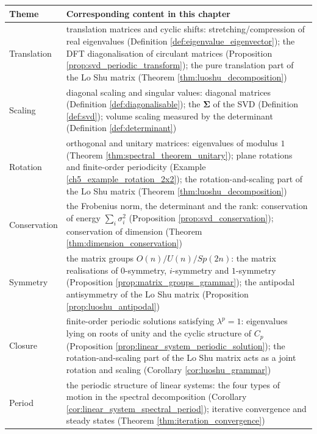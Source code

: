 \begingroup
\renewcommand{\arraystretch}{1.3}
\begin{longtable}{>{\raggedright\arraybackslash}p{3cm}>{\raggedright\arraybackslash}p{10.5cm}}
\toprule
Theme & Corresponding content in this chapter \\
\midrule
Translation & translation matrices and cyclic shifts: stretching/compression of real eigenvalues (Definition \ref{def:eigenvalue_eigenvector}); the DFT diagonalisation of circulant matrices (Proposition \ref{prop:svd_periodic_transform}); the pure translation part of the Lo Shu matrix (Theorem \ref{thm:luoshu_decomposition}) \\
Scaling & diagonal scaling and singular values: diagonal matrices (Definition \ref{def:diagonalisable}); the $\boldsymbol{\Sigma}$ of the SVD (Definition \ref{def:svd}); volume scaling measured by the determinant (Definition \ref{def:determinant}) \\
Rotation & orthogonal and unitary matrices: eigenvalues of modulus $1$ (Theorem \ref{thm:spectral_theorem_unitary}); plane rotations and finite-order periodicity (Example \ref{ch5_example_rotation_2x2}); the rotation-and-scaling part of the Lo Shu matrix (Theorem \ref{thm:luoshu_decomposition}) \\
Conservation & the Frobenius norm, the determinant and the rank: conservation of energy $\sum_i \sigma_i^2$ (Proposition \ref{prop:svd_conservation}); conservation of dimension (Theorem \ref{thm:dimension_conservation}) \\
Symmetry & the matrix groups $O(n)/U(n)/Sp(2n)$: the matrix realisations of $0$-symmetry, $i$-symmetry and $1$-symmetry (Proposition \ref{prop:matrix_groups_grammar}); the antipodal antisymmetry of the Lo Shu matrix (Proposition \ref{prop:luoshu_antipodal}) \\
Closure & finite-order periodic solutions satisfying $\lambda^p = 1$: eigenvalues lying on roots of unity and the cyclic structure of $C_p$ (Proposition \ref{prop:linear_system_periodic_solution}); the rotation-and-scaling part of the Lo Shu matrix acts as a joint rotation and scaling (Corollary \ref{cor:luoshu_grammar}) \\
Period & the periodic structure of linear systems: the four types of motion in the spectral decomposition (Corollary \ref{cor:linear_system_spectral_period}); iterative convergence and steady states (Theorem \ref{thm:iteration_convergence}) \\
\bottomrule
\end{longtable}
\endgroup

